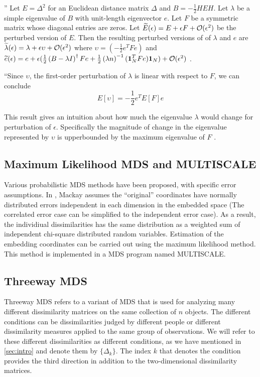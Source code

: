 \documentclass[12pt,oneside,final]{thesis}\usepackage[]{graphicx}\usepackage[]{color}
\begin{document}
    '' Let $E=\Delta^2$ for an Euclidean distance matrix $\Delta$ and $B=-{\frac{1}{2}}HEH$. Let $\lambda$ be a simple eigenvalue of $B$ with unit-length eigenvector $e$. Let $F$ be a symmetric matrix whose diagonal entries are zeros. Let $\widetilde E(\epsilon)= E +\epsilon F + \mathcal{O}(\epsilon ^2)$ be the perturbed version of $E$. Then the resulting perturbed versions of of $\lambda$ and $e$ are  $\widetilde \lambda(\epsilon)= \lambda +\epsilon \upsilon + \mathcal{O}(\epsilon ^2)$ where $\upsilon=(-\frac{1}{2}e^TFe)$ and  $\widetilde e(\epsilon)= e +\epsilon (\frac{1}{2}\left(B-\lambda I\right)^{\dag}Fe + \frac{1}{2} \left(\lambda n\right)^{-1}(\mbox{{\bf 1}}_N^T F e)\mbox{{\bf 1}}_N) + \mathcal{O}(\epsilon ^2)$
    .
    
    ``Since  $\upsilon$, the first-order perturbation of $\lambda$ is linear with respect to $F$, we can conclude 
  \[ E[\upsilon]= -\frac{1}{2}e^TE[F]e
  \]  
  
  This result gives an intuition about how much the eigenvalue $\lambda$ would change for perturbation of $\epsilon$. Specifically the magnitude of change in the eigenvalue represented by $\upsilon$ is upperbounded  by the maximum eigenvalue of $F$ .
\subsection{Maximum Likelihood MDS and MULTISCALE}
Various probabilistic MDS methods have been proposed, with specific error assumptions.  In \cite{MacKay1989}, Mackay assumes the ``original'' coordinates have normally distributed errors independent in each dimension in the embedded space (The correlated error case can be simplified to the independent error case). As a result, the individiual dissimilarities has the same distribution as a weighted sum of independent chi-square distributed  random variables. Estimation of the embedding coordinates can be carried out using the maximum likelihood method. This method is implemented in a MDS program named MULTISCALE\cite{multiscale}.

\subsection{Threeway MDS}
Threeway MDS refers to  a variant of MDS that is used for analyzing many different dissimilarity matrices on the same collection of $n$ objects.  The different conditions  can be dissimilarities judged by different people or different dissimilarity measures applied to the same group of observations. We will refer to these different dissimilarities as different conditions, as we have mentioned in \autoref{sec:intro} and denote them by $\{\Delta_k\}$. The index $k$ that denotes the condition provides the third direction in addition to the  two-dimensional dissimilarity matrices.
\end{document}
